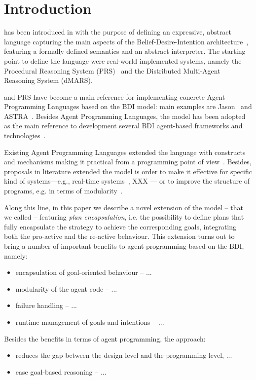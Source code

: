 \section{Introduction}
\label{sec:intro}


%
%
{\asl} has been introduced in \cite{Rao96}  with the purpose of defining an expressive, 
abstract language capturing the main aspects of the Belief-Desire-Intention architecture~\cite{Bratman88,Georgeff:1987:RRP:1863766.1863818}, featuring a formally defined semantics and an abstract interpreter.
%
The starting point to define the language were real-world implemented systems, namely the
Procedural Reasoning System (PRS)~\cite{Ingrand:1992:ARR:629535.629890} and the Distributed Multi-Agent Reasoning System (dMARS).
%

%
% 
{\asl}  and PRS have become a main reference for implementing concrete Agent Programming Languages 
based on the BDI model: 
%
main examples are Jason~\cite{jason06,bordini:07} and ASTRA~\cite{DBLP:conf/prima/CollierRL15}.
%
Besides Agent Programming Languages,  the {\asl}  model has been adopted as the main reference to development several BDI agent-based frameworks and technologies~\cite{BordiniMAPlpa,BordiniMAPlta}.


%
%
Existing Agent Programming Languages extended the language with constructs and mechanisms making it  practical from a programming point of view~\cite{jason06}.
%
Besides, proposals in literature extended the model is order to make it effective for specific kind of systems---e.g., real-time systems~\cite{Vikhorev:2011:APP:2030470.2030529}, XXX --- or to improve the structure of programs, e.g. in terms of modularity~\cite{Madden2010,Nunes2014}.

%
Along this line, in this paper we describe a novel extension of the {\asl}  model -- that we called {\aser} -- featuring \emph{plan encapsulation}, i.e. the possibility to define plans that fully encapsulate the strategy to achieve the corresponding goals, integrating both the pro-active and the re-active behaviour.
%
%
This extension turns out to bring a number of important benefits to agent programming based on the BDI, namely:
%
\begin{itemize}
\item encapsulation of goal-oriented behaviour -- ...
\item modularity of the agent code -- ...
\item failure handling -- ...
\item runtime management of goals and intentions -- ...
\end{itemize}
%
\noindent Besides the benefits in terms of agent programming, the approach:
%
\begin{itemize}
\item reduces the gap between the design level and the programming level,  ...
\item ease goal-based reasoning -- ...
\end{itemize}


